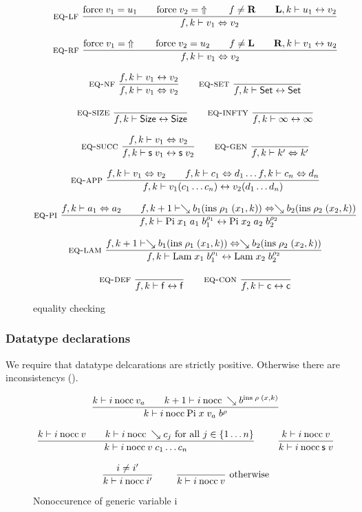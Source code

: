 \begin{figure}[p]
\begin{gather*}
\mbox{\sc eq-lf}\ \dfrac{\mathrm{force} \; v_1 = u_1 \qquad \mathrm{force} \; v_2 = \;\Uparrow 
\qquad
f \neq \mathbf{R} \qquad \mathbf{L},k\vdash u_1{\;\leftrightarrow\;}v_2}{ f,k\vdash v_1\Leftrightarrow v_2}
\\[2ex]
\mbox{\sc eq-rf}\ \dfrac{\mathrm{force} \; v_1 = \;\Uparrow \qquad \mathrm{force} \; v_2 = u_2 
\qquad
f \neq \mathbf{L} \qquad \mathbf{R},k\vdash v_1{\;\leftrightarrow\;}u_2}{ f,k\vdash v_1\Leftrightarrow v_2}
\\[2ex]
\mbox{\sc eq-nf}\ \dfrac{f,k\vdash v_1{\;\leftrightarrow\;}v_2}{ f,k\vdash v_1\Leftrightarrow v_2}
\qquad
\mbox{\sc eq-set}\ \dfrac{}{f,k\vdash\mathsf{Set}{\;\leftrightarrow\;}\mathsf{Set}}
\\[2ex]
\mbox{\sc eq-size}\ \dfrac{}{f,k\vdash\mathsf{Size}{\;\leftrightarrow\;}\mathsf{Size}}
\qquad
\mbox{\sc eq-infty}\ \dfrac{}{f,k\vdash\infty{\;\leftrightarrow\;}\infty}
\\[2ex]
\mbox{\sc eq-succ}\ \dfrac{f,k\vdash v_1\Leftrightarrow v_2}{f,k\vdash\mathsf{s}\; v_1{\;\leftrightarrow\;}\mathsf{s}\; v_2}
\qquad
\mbox{\sc eq-gen}\ \dfrac{}{f,k\vdash k'\Leftrightarrow k'}
\\[2ex]
\mbox{\sc eq-app}\ \dfrac{f,k\vdash v_1\Leftrightarrow v_2 \qquad
f,k\vdash c_1\Leftrightarrow d_1 \ldots f,k\vdash c_n\Leftrightarrow d_n}{f,k\vdash v_1 (c_1 \ldots c_n){\;\leftrightarrow\;}v_2 (d_1 \ldots d_n)}
\\[2ex]
\mbox{\sc eq-pi}\ \dfrac{f,k\vdash a_1\Leftrightarrow a_2
\qquad
f,k+1\vdash\searrow b_1 (\mathrm{ins} \; \rho_1 \; (x_1,k))\Leftrightarrow\searrow b_2 (\mathrm{ins} \; \rho_2 \; (x_2,k))}{f,k\vdash\mathrm{Pi} \; x_1 \; a_1 \; b_1^{\rho_1}{\;\leftrightarrow\;}\mathrm{Pi} \; x_2 \; a_2 \; b_2^{\rho_2}}
\\[2ex]
\mbox{\sc eq-lam}\ \dfrac{f,k+1\vdash\searrow b_1 (\mathrm{ins} \; \rho_1 \; (x_1,k))\Leftrightarrow\searrow b_2 (\mathrm{ins} \; \rho_2 \; (x_2,k))}{f,k\vdash\mathrm{Lam} \; x_1 \; b_1^{\rho_1}{\;\leftrightarrow\;}\mathrm{Lam} \; x_2 \; b_2^{\rho_2}}
\\[2ex]
\mbox{\sc eq-def}\ \dfrac{}{f,k\vdash\mathsf{f}{\;\leftrightarrow\;}\mathsf{f}}
\qquad
\mbox{\sc eq-con}\ \dfrac{}{f,k\vdash\mathsf{c}{\;\leftrightarrow\;}\mathsf{c}}
\end{gather*}
\caption{equality checking}
\end{figure}

\subsubsection{Datatype declarations}
We require that datatype delcarations are strictly positive.
Otherwise there are inconsistencys (\cite{paulinmohring93inductive}).
\newcommand{\nocc}[3]{#1\vdash#2\:\mbox{nocc}\:#3}

\begin{figure}
\begin{gather*}
\nru{}
{\nocc{k}{i}{v_a} \qquad \nocc{k+1}{i}{\wh \cl{b}{\ins \; \rho \; (x,k)}}}
{\nocc{k}{i}{\vpi \; x \; v_a \; \cl{b}{\rho}}  }
\\[2ex]
\nru{}
{\nocc{k}{i}{v} \qquad \nocc{k}{i}{\wh c_j} \mbox{ for all } j \in \{1 \ldots n \}}
{\nocc{k}{i}{v \; c_1 \ldots c_n}}
\qquad
\nru{}
{\nocc{k}{i}{v}}
{\nocc{k}{i}{\s v}}
\\[2ex]
\nru{}
{i \neq i'}
{\nocc{k}{i}{i'}}
\qquad
\nrux{}
{}
{\nocc{k}{i}{v}}
{\mbox{otherwise}}
\end{gather*}
\caption{Nonoccurence of generic variable i}
\end{figure}

